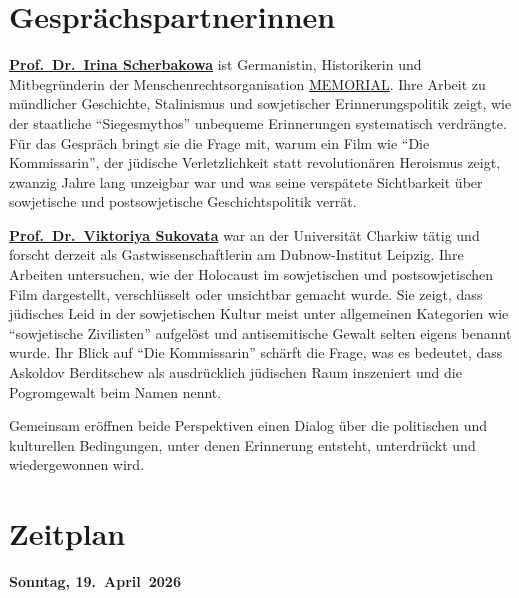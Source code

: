 \documentclass[11pt,a4paper]{article}
\begin{document}
\section*{Gespr\"achspartnerinnen}

\textbf{\href{https://www.zfl-berlin.org/person/scherbakowa.html}{Prof.\ Dr.\ Irina Scherbakowa}} ist Germanistin, Historikerin und Mitbegr\"underin der Menschenrechtsorganisation \href{https://www.memorial.de/}{MEMORIAL}. Ihre Arbeit zu m\"undlicher Geschichte, Stalinismus und sowjetischer Erinnerungspolitik zeigt, wie der staatliche \enquote{Siegesmythos} unbequeme Erinnerungen systematisch verdr\"angte. F\"ur das Gespr\"ach bringt sie die Frage mit, warum ein Film wie \enquote{Die Kommissarin}, der j\"udische Verletzlichkeit statt revolution\"aren Heroismus zeigt, zwanzig Jahre lang unzeigbar war und was seine versp\"atete Sichtbarkeit \"uber sowjetische und postsowjetische Geschichtspolitik verr\"at.

\textbf{\href{https://www.dubnow.de/person/prof-dr-victoryia-a-sukovata}{Prof.\ Dr.\ Viktoriya Sukovata}} war an der Universit\"at Charkiw t\"atig und forscht derzeit als Gastwissenschaftlerin am Dubnow-Institut Leipzig. Ihre Arbeiten untersuchen, wie der Holocaust im sowjetischen und postsowjetischen Film dargestellt, verschl\"usselt oder unsichtbar gemacht wurde. Sie zeigt, dass j\"udisches Leid in der sowjetischen Kultur meist unter allgemeinen Kategorien wie \enquote{sowjetische Zivilisten} aufgel\"ost und antisemitische Gewalt selten eigens benannt wurde. Ihr Blick auf \enquote{Die Kommissarin} sch\"arft die Frage, was es bedeutet, dass Askoldov Berditschew als ausdr\"ucklich j\"udischen Raum inszeniert und die Pogromgewalt beim Namen nennt.

Gemeinsam er\"offnen beide Perspektiven einen Dialog \"uber die politischen und kulturellen Bedingungen, unter denen Erinnerung entsteht, unterdr\"uckt und wiedergewonnen wird.

\section*{Zeitplan}

\noindent\textbf{Sonntag, 19.~April~2026}
\end{document}
